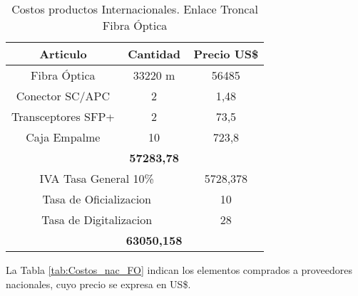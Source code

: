 \begin{table}[H]
  \centering
    \begin{tabular}{|c|c|c|}
    \hline
    \rowcolor[rgb]{ .773,  .851,  .945} \textbf{Articulo} & \textbf{Cantidad} & \textbf{Precio US\$} \bigstrut\\
    \hline
    \multicolumn{1}{|p{11.22em}|}{Fibra Óptica} & \multicolumn{1}{p{7.055em}|}{33220 m} & 56485 \bigstrut\\
    \hline
    \multicolumn{1}{|p{11.22em}|}{Conector SC/APC} & 2     & 1,48 \bigstrut\\
    \hline
    \multicolumn{1}{|p{11.22em}|}{Transceptores SFP+} & 2     & 73,5 \bigstrut\\
    \hline
    \multicolumn{1}{|p{11.22em}|}{Caja Empalme} & 10    & 723,8 \bigstrut\\
    \hline
    \rowcolor[rgb]{ .773,  .851,  .945} \multicolumn{2}{|c|}{\textbf{Costo}} & \textbf{57283,78} \bigstrut\\
    \hline
    \multicolumn{2}{|p{18.275em}|}{IVA Tasa General 10\%} & 5728,378 \bigstrut\\
    \hline
    \multicolumn{2}{|p{18.275em}|}{Tasa de Oficializacion} & 10 \bigstrut\\
    \hline
    \multicolumn{2}{|p{18.275em}|}{Tasa de Digitalizacion} & 28 \bigstrut\\
    \hline
    \rowcolor[rgb]{ .773,  .851,  .945} \multicolumn{2}{|c|}{\textbf{Total}} & \textbf{63050,158} \bigstrut\\
    \hline
    \end{tabular}%
    \caption{Costos productos Internacionales. Enlace Troncal Fibra Óptica}
  \label{tab:Costos_int_FO}%
\end{table}%



La Tabla \ref{tab:Costos_nac_FO} indican los elementos comprados a proveedores nacionales, cuyo precio se expresa en US\$. 




